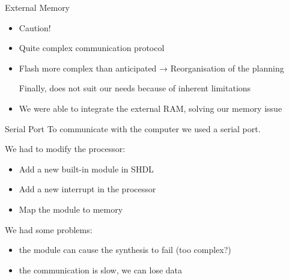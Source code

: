 \documentclass{beamer}
\begin{document}
      \begin{frame}{External Memory}
        \begin{itemize}
          \item Caution!
          \item Quite complex communication protocol
        \end{itemize}
        \pause
        \begin{itemize}
          \item Flash more complex than anticipated → Reorganisation of the
            planning

            Finally, does not suit our needs because of inherent limitations
        \pause

          \item We were able to integrate the external RAM, solving our memory
            issue
        \end{itemize}
      \end{frame}

      \begin{frame}{Serial Port}
        To communicate with the computer we used a serial port.

        \pause
        We had to modify the processor:
        \begin{itemize}
          \item Add a new built-in module in SHDL
          \item Add a new interrupt in the processor
          \item Map the module to memory
        \end{itemize}

        \pause
        We had some problems:
        \begin{itemize}
          \item the module can cause the synthesis to fail (too complex?)
          \item the communication is slow, we can lose data
        \end{itemize}
      \end{frame}
\end{document}
